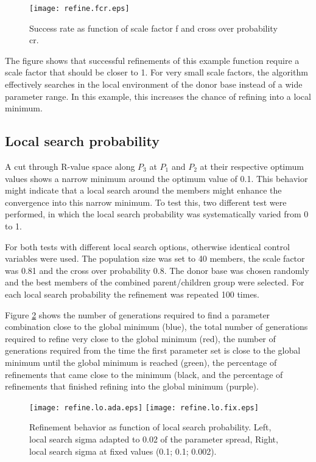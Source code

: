 \begin{figure}[htbp]
   \texttt{[image: refine.fcr.eps]}
   \caption{Success rate as function of scale factor f and
    cross over probability cr.}
   \label{evo-fcr}
\end{figure}

The figure shows that successful refinements of this example function
require a scale factor
that should be closer to 1. For very small scale factors, the 
algorithm effectively searches in the local environment of the 
donor base instead of a wide parameter range. In this example, this
increases the chance of refining into a local minimum.

\subsection{Local search probability}

A cut through R-value space along $P_{3}$ at $P_{1}$ and $P_{2}$ at their
respective optimum values shows a narrow minimum around the optimum
value of 0.1. This behavior might indicate that a local search around the
members might enhance the convergence into this narrow minimum. To
test this, two different test were performed, in which the local search 
probability was systematically varied from 0 to 1. 

For both tests with different local search options, otherwise identical 
control variables were used. The population size was set to 40 members,
the scale factor was 0.81 and the cross over probability 0.8. The donor
base was chosen randomly and the best members of the combined parent/children
group were selected. For each local search probability the refinement
was repeated 100 times.

Figure \ref{evo-lo} shows the number of generations required to 
find a parameter combination close to the global minimum (blue), the total
number of generations required to refine very close to the global minimum
(red), the number of generations required from the time the first 
parameter set is close to the global minimum until the global minimum is
reached (green), the percentage of refinements that came close to the 
minimum (black, and the percentage of refinements that finished refining
into the global minimum (purple).

\begin{figure}[htbp]
   \texttt{[image: refine.lo.ada.eps]}
   \texttt{[image: refine.lo.fix.eps]}
   \caption{Refinement behavior as function of local search probability.
    Left, local search sigma adapted to 0.02 of the parameter spread,
    Right, local search sigma at fixed values (0.1; 0.1; 0.002). }
   \label{evo-lo}
\end{figure}

